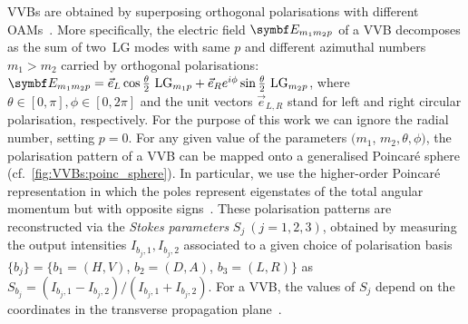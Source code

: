 
\acfp{VVB} are obtained by superposing orthogonal polarisations with different \acp{OAM}~\cite{padgett2004lights}.
More specifically, the electric field $\bs{E}_{m_1m_2p}$ of a \ac{VVB} decomposes as the sum of two~\ac{LG} modes with same $p$ and different azimuthal numbers $m_1>m_2$ carried by orthogonal polarisations:
$\bs{E}_{m_1m_2p}=\Vec{e}_L \cos{ \frac{\theta}{2}}\text{ LG$_{m_1p}$} +\Vec{e}_R e^{i \phi} \sin{ \frac{\theta}{2}}\text{ LG$_{m_2p}$}$,
where $\theta\in[0,\pi], \phi\in[0,2\pi]$ and the unit vectors $\Vec{e}_{L,R}$ stand for left and right circular polarisation, respectively.
For the purpose of this work we can ignore the radial number, setting $p=0$.
For any given value of the parameters $(m_1$, $m_2, \theta, \phi)$, the polarisation pattern of a \ac{VVB} can be mapped onto a generalised Poincar\'e sphere (cf.~\cref{fig:VVBs:poinc_sphere}). In particular, we use the higher-order Poincar\'e representation in which the poles represent eigenstates of the total angular momentum but with opposite signs~\cite{milione2011higherorder}.
These polarisation patterns are reconstructed via the \emph{Stokes parameters} $S_{j}~(j=1,2,3)$, obtained by
measuring the output intensities $I_{b_j,1},I_{b_j,2}$ associated to a given choice of polarisation basis $\{b_j \}=\{b_1=( H,V )$, $b_2=( D,A )$, $b_3=( L,R )\}$ as $S_{b_j}=(I_{b_j,1}-I_{b_j,2})/(I_{b_j,1}+I_{b_j,2})$.
For a \ac{VVB}, the values of $S_j$ depend on the coordinates in the transverse propagation plane~\cite{cardano2012polarization}.


